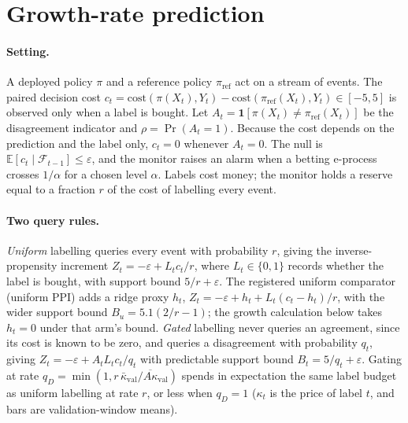 
\section{Growth-rate prediction}\label{sec:prediction}

\paragraph{Setting.}
A deployed policy $\pi$ and a reference policy $\pi_{\mathrm{ref}}$ act on a stream of events. The paired
decision cost $c_t = \mathrm{cost}(\pi(X_t),Y_t)-\mathrm{cost}(\pi_{\mathrm{ref}}(X_t),Y_t)\in[-5,5]$ is observed only
when a label is bought. Let $A_t=\mathbf 1[\pi(X_t)\neq\pi_{\mathrm{ref}}(X_t)]$ be the disagreement indicator and $\rho=\Pr(A_t=1)$.
Because the cost depends on the prediction and the label only, $c_t=0$ whenever $A_t=0$. The null is
$\mathbb E[c_t\mid\mathcal F_{t-1}]\le\varepsilon$, and the monitor raises an alarm when a betting e-process crosses $1/\alpha$ for a chosen level $\alpha$.
Labels cost money; the monitor holds a reserve equal to a fraction $r$ of the cost of labelling every event.

\paragraph{Two query rules.}
\emph{Uniform} labelling queries every event with probability $r$, giving the inverse-propensity increment
$Z_t=-\varepsilon+L_tc_t/r$, where $L_t\in\{0,1\}$ records whether the label is bought, with support bound $5/r+\varepsilon$.
The registered uniform comparator (uniform PPI) adds a ridge proxy $h_t$, $Z_t=-\varepsilon+h_t+L_t(c_t-h_t)/r$, with the wider support bound $B_u=5.1(2/r-1)$;
the growth calculation below takes $h_t=0$ under that arm's bound.
\emph{Gated} labelling never queries an agreement, since its cost is known to be zero, and queries a disagreement with
probability $q_t$, giving $Z_t=-\varepsilon+A_tL_tc_t/q_t$ with predictable support bound $B_t=5/q_t+\varepsilon$.
Gating at rate $q_D=\min(1,r\,\bar\kappa_{\mathrm{val}}/\overline{A\kappa}_{\mathrm{val}})$ spends in expectation the same label budget
as uniform labelling at rate $r$, or less when $q_D=1$ ($\kappa_t$ is the price of label $t$, and bars are validation-window means).

